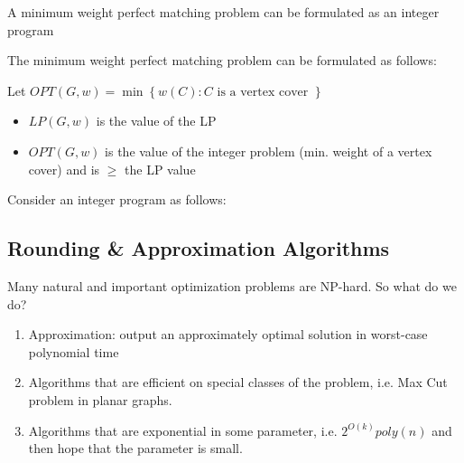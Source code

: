 \documentclass[../notes.tex]{subfiles}
\begin{document}
A minimum weight perfect matching problem can be formulated as an integer program

The minimum weight perfect matching problem can be formulated as follows:


Let $ OPT(G, w) = \min \left\{  w(C): C \text{ is a vertex cover } \right\}  $



\begin{itemize}
    \item $ LP(G, w) $ is the value of the LP
    \item $ OPT(G, w) $ is the value of the integer problem (min. weight of a vertex cover) and is $ \ge  $ the LP value
\end{itemize}




Consider an integer program as follows:


\subsection{Rounding \& Approximation Algorithms}

Many natural and important optimization problems are NP-hard. So what do we do? 

\begin{enumerate}
    \item Approximation: output an approximately optimal solution in worst-case polynomial time
    \item Algorithms that are efficient on special classes of the problem, i.e. Max Cut problem in planar graphs.
    \item Algorithms that are exponential in some parameter, i.e. $ 2^{O(k)} poly(n) $ and then hope that the parameter is small.
\end{enumerate}
\end{document}
